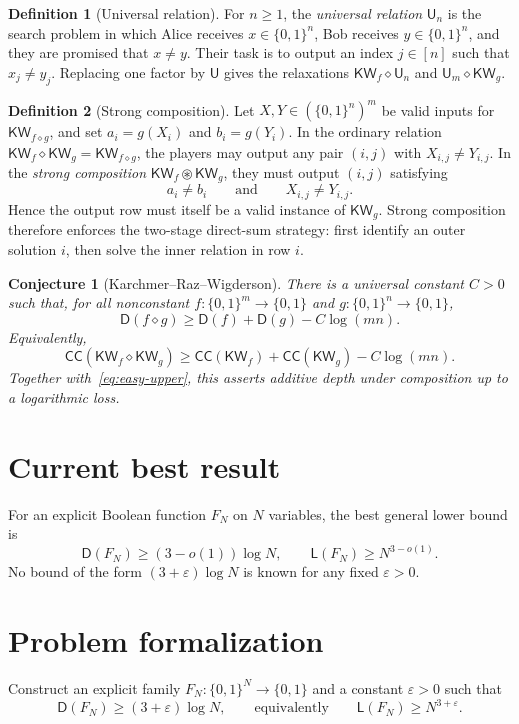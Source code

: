 \documentclass[10pt,a4paper]{article}
\theoremstyle{definition}
\newtheorem{definition}{Definition}
\theoremstyle{plain}
\newtheorem{conjecture}{Conjecture}
\theoremstyle{definition}
\newcommand{\KW}{\mathsf{KW}}
\newcommand{\CC}{\mathsf{CC}}
\newcommand{\Depth}{\mathsf{D}}
\newcommand{\Size}{\mathsf{L}}
\newcommand{\UR}{\mathsf{U}}
\begin{document}
\begin{definition}[Universal relation]
For $n\geq 1$, the \emph{universal relation} $\UR_n$ is the search problem in
which Alice receives $x\in\{0,1\}^n$, Bob receives $y\in\{0,1\}^n$, and they are
promised that $x\neq y$. Their task is to output an index $j\in[n]$ such that
$x_j\neq y_j$. Replacing one factor by $\UR$ gives the relaxations
$\KW_f\diamond\UR_n$ and $\UR_m\diamond\KW_g$.
\end{definition}

\begin{definition}[Strong composition]
Let $X,Y\in(\{0,1\}^n)^m$ be valid inputs for $\KW_{f\diamond g}$, and set
$a_i=g(X_i)$ and $b_i=g(Y_i)$. In the ordinary relation
$\KW_f\diamond\KW_g=\KW_{f\diamond g}$, the players may output any pair $(i,j)$
with $X_{i,j}\neq Y_{i,j}$. In the \emph{strong composition}
$\KW_f\circledast\KW_g$, they must output $(i,j)$ satisfying
\begin{equation}\label{eq:strong-def}
  a_i\neq b_i
  \qquad\text{and}\qquad
  X_{i,j}\neq Y_{i,j}.
\end{equation}
Hence the output row must itself be a valid instance of $\KW_g$. Strong composition
therefore enforces the two-stage direct-sum strategy: first identify an outer solution
$i$, then solve the inner relation in row $i$.
\end{definition}

\begin{conjecture}[Karchmer--Raz--Wigderson]\label{conj:krw}
There is a universal constant $C>0$ such that, for all nonconstant
$f:\{0,1\}^{m}\to\{0,1\}$ and $g:\{0,1\}^{n}\to\{0,1\}$,
\begin{equation}\label{eq:krw}
  \Depth(f\diamond g)
  \geq \Depth(f)+\Depth(g)-C\log(mn).
\end{equation}
Equivalently,
\begin{equation}\label{eq:krw-cc}
  \CC(\KW_f\diamond\KW_g)
  \geq \CC(\KW_f)+\CC(\KW_g)-C\log(mn).
\end{equation}
Together with~\eqref{eq:easy-upper}, this asserts additive depth under composition
up to a logarithmic loss.
\end{conjecture}

\section{Current best result}
For an explicit Boolean function $F_N$ on $N$ variables, the best general lower
bound is
\begin{equation}
  \Depth(F_N)\geq(3-o(1))\log N,
  \qquad
  \Size(F_N)\geq N^{3-o(1)}.
\end{equation}
No bound of the form $(3+\varepsilon)\log N$ is known for any fixed
$\varepsilon>0$.

\section{Problem formalization}
Construct an explicit family $F_N:\{0,1\}^N\to\{0,1\}$ and a constant
$\varepsilon>0$ such that
\begin{equation}
  \Depth(F_N)\geq(3+\varepsilon)\log N,
  \qquad\text{equivalently}\qquad
  \Size(F_N)\geq N^{3+\varepsilon}.
\end{equation}
\end{document}
